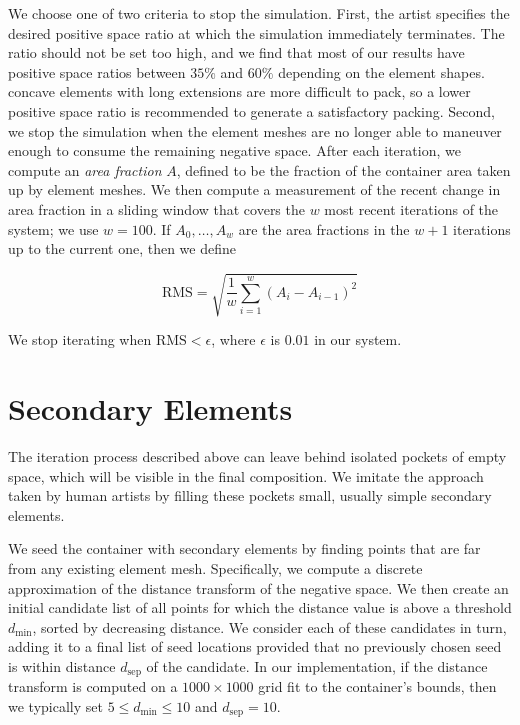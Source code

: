 We choose one of two criteria to stop the simulation. First, the artist specifies 
the desired positive space ratio at which the simulation immediately terminates.
The ratio should not be set too high, and
we find that most of our results have positive space ratios between $35\%$ and $60\%$ depending on the element shapes.
concave elements with long extensions are more difficult to pack, 
so a lower positive space ratio is recommended to generate a satisfactory packing.
Second, we stop the simulation when the element meshes are no longer
able to maneuver enough to consume the remaining negative space. 
After each iteration, we compute an \textit{area fraction} $A$, defined to be the fraction of
the container area taken up by element meshes.  We then compute a measurement
of the recent change in area fraction in a sliding window that covers the $w$
most recent iterations of the system; we use $w=100$.  If $A_0,\ldots,A_w$
are the area fractions in the $w+1$ iterations up to the current one, then we
define

\begin{equation}
\mathrm{RMS} = \sqrt{ \frac{1}{w}\sum_{ i = 1 }^{w} { (A_i - A_{i-1}) }^2}
\end{equation}

We stop iterating when $\mathrm{RMS} < \epsilon$, where $\epsilon$ is $0.01$
in our system.

\section{Secondary Elements}
\label{repulsionpak_secondary_elements}

The iteration process described above can leave behind isolated pockets of 
empty space, which will be visible in the final composition.  We imitate the
approach taken by human artists by filling these pockets  small, usually
simple secondary elements.  

We seed the container with secondary elements by finding points
that are far from any existing element mesh.  Specifically, we
compute a discrete approximation of the distance transform of the
negative space. We then create an initial candidate list of all
points for which the distance value is above a threshold $d_\mathrm{min}$, 
sorted by decreasing distance.  We consider each of these candidates in turn,
adding it to a final list of seed locations provided that no previously
chosen seed is within distance $d_\mathrm{sep}$ of the candidate.
In our implementation, if the distance transform is computed on a 
$1000\times 1000$ grid fit to the container's bounds, then we typically 
set $5 \leq d_\mathrm{min} \leq 10$ and $d_\mathrm{sep}=10$. 

